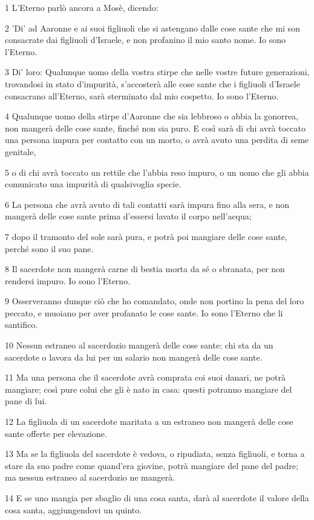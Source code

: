 \par 1 L'Eterno parlò ancora a Mosè, dicendo:
\par 2 'Di' ad Aaronne e ai suoi figliuoli che si astengano dalle cose sante che mi son consacrate dai figliuoli d'Israele, e non profanino il mio santo nome. Io sono l'Eterno.
\par 3 Di' loro: Qualunque uomo della vostra stirpe che nelle vostre future generazioni, trovandosi in stato d'impurità, s'accosterà alle cose sante che i figliuoli d'Israele consacrano all'Eterno, sarà sterminato dal mio cospetto. Io sono l'Eterno.
\par 4 Qualunque uomo della stirpe d'Aaronne che sia lebbroso o abbia la gonorrea, non mangerà delle cose sante, finché non sia puro. E così sarà di chi avrà toccato una persona impura per contatto con un morto, o avrà avuto una perdita di seme genitale,
\par 5 o di chi avrà toccato un rettile che l'abbia reso impuro, o un uomo che gli abbia comunicato una impurità di qualsivoglia specie.
\par 6 La persona che avrà avuto di tali contatti sarà impura fino alla sera, e non mangerà delle cose sante prima d'essersi lavato il corpo nell'acqua;
\par 7 dopo il tramonto del sole sarà pura, e potrà poi mangiare delle cose sante, perché sono il suo pane.
\par 8 Il sacerdote non mangerà carne di bestia morta da sé o sbranata, per non rendersi impuro. Io sono l'Eterno.
\par 9 Osserveranno dunque ciò che ho comandato, onde non portino la pena del loro peccato, e muoiano per aver profanato le cose sante. Io sono l'Eterno che li santifico.
\par 10 Nessun estraneo al sacerdozio mangerà delle cose sante: chi sta da un sacerdote o lavora da lui per un salario non mangerà delle cose sante.
\par 11 Ma una persona che il sacerdote avrà comprata coi suoi danari, ne potrà mangiare; così pure colui che gli è nato in casa: questi potranno mangiare del pane di lui.
\par 12 La figliuola di un sacerdote maritata a un estraneo non mangerà delle cose sante offerte per elevazione.
\par 13 Ma se la figliuola del sacerdote è vedova, o ripudiata, senza figliuoli, e torna a stare da suo padre come quand'era giovine, potrà mangiare del pane del padre; ma nessun estraneo al sacerdozio ne mangerà.
\par 14 E se uno mangia per sbaglio di una cosa santa, darà al sacerdote il valore della cosa santa, aggiungendovi un quinto.
